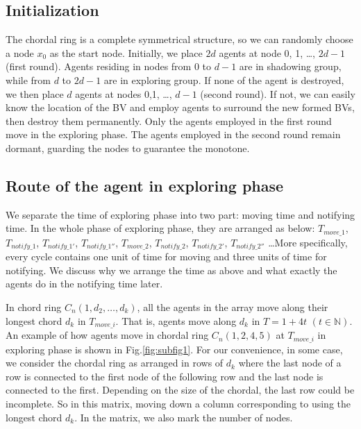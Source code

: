 \documentclass[conference]{IEEEtran}
\begin{document}
\subsection{Initialization }
The chordal ring is a complete symmetrical structure, so we can randomly choose a node $x_0$ as the start node. Initially, we place $2d$ agents at node 0, 1, \ldots , $2d-1$ (first round). Agents residing in nodes from $0$ to $d-1$ are in shadowing group, while from $d$ to $2d-1$ are in exploring group. If none of the agent is destroyed, we then place $d$ agents at nodes 0,1, \ldots, $d-1$ (second round). If not, we can easily know the location of the BV and employ agents to surround the new formed BVs, then destroy them permanently. Only the agents employed in the first round move in the exploring phase. The agents employed in the second round remain dormant, guarding the nodes to guarantee the monotone. \\

\subsection{Route of the agent in exploring phase}
We separate the time of exploring phase into two part: moving time and notifying time. In the whole phase of exploring phase, they are arranged as below: $T_{move\_1}$, $T_{notify\_1}$, $T_{notify\_1'}$, $T_{notify\_1''}$, $T_{move\_2}$, $T_{notify\_2}$, $T_{notify\_2'}$, $T_{notify\_2''}$ \dots More specifically, every cycle contains one unit of time for moving and three units of time for notifying. We discuss why we arrange the time as above and what exactly the agents do in the notifying time later. 

In chord ring $C_n(1, d_2, \ldots, d_k)$, all the agents in the array move along their longest chord $d_k$ in $T_{move\_i}$. That is, agents move along $d_k$ in $T=1+4t$ $(t\in \mathbb{N})$.  An example of how agents move in chordal ring $C_n(1, 2 , 4, 5)$ at $T_{move\_i}$ in exploring phase is shown in Fig.\ref{fig:subfig1}. For our convenience, in some case, we consider the chordal ring as arranged in rows of $d_k$ where the last node of a row is connected to the first node of the following row and the last node is connected to the first. Depending on the size of the chordal, the last row could be incomplete. So in this matrix, moving down a column corresponding to using the longest chord $d_k$. In the matrix, we also mark the number of nodes.\\
\end{document}
